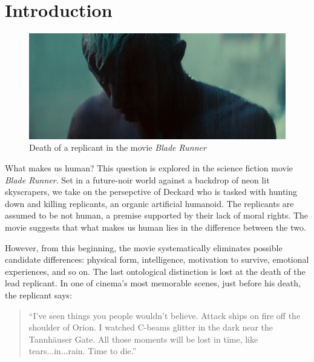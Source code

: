 


\chapter{Introduction}
\label{chap_intro}


   \begin{figure}[thpb]
      \centering
      \includegraphics[width=4.6in]{figures/intro/tears_in_the_rain.png}
      \caption{Death of a replicant in the movie \textit{Blade Runner}}
      \label{fig_ec_story_no_story_lm}
   \end{figure}


What makes us human? This question is explored in the science fiction movie \textit{Blade Runner}. Set in a future-noir world against a backdrop of neon lit skyscrapers, we take on the persepctive of Deckard who is tasked with hunting down and killing replicants, an organic artificial humanoid. The replicants are assumed to be not human, a premise supported by their lack of moral rights. The movie suggests that what makes us human lies in the difference between the two. 

However, from this beginning, the movie systematically eliminates possible candidate differences: physical form, intelligence, motivation to survive, emotional experiences, and so on. The last ontological distinction is lost at the death of the lead replicant. In one of cinema's most memorable scenes, just before his death, the replicant says:

\begin{quotation}

``I've seen things you people wouldn't believe. Attack ships on fire off the shoulder of Orion. I watched C-beams glitter in the dark near the Tannh\"{a}user Gate. All those moments will be lost in time, like tears...in...rain. Time to die.''

\end{quotation}

